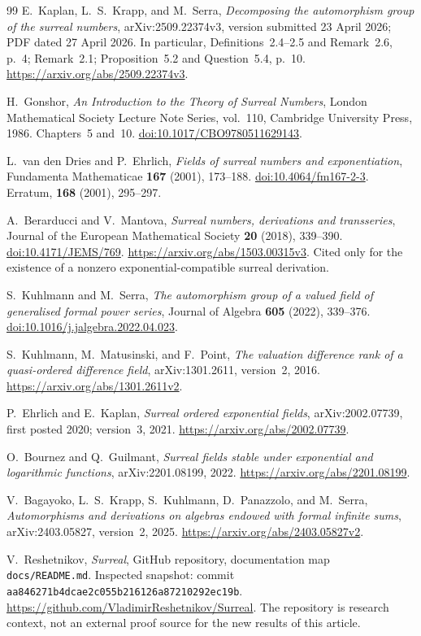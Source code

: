 \documentclass[11pt]{article}
\theoremstyle{definition}
\theoremstyle{remark}
\numberwithin{equation}{section}
\begin{document}
\begin{thebibliography}{99}
E.~Kaplan, L.~S.~Krapp, and M.~Serra,
\emph{Decomposing the automorphism group of the surreal numbers},
arXiv:2509.22374v3, version submitted 23 April 2026; PDF dated 27 April 2026.
In particular, Definitions~2.4--2.5 and Remark~2.6, p.~4; Remark~2.1;
Proposition~5.2 and Question~5.4, p.~10.
\url{https://arxiv.org/abs/2509.22374v3}.

H.~Gonshor,
\emph{An Introduction to the Theory of Surreal Numbers},
London Mathematical Society Lecture Note Series, vol.~110,
Cambridge University Press, 1986. Chapters~5 and~10.
\href{https://doi.org/10.1017/CBO9780511629143}{doi:10.1017/CBO9780511629143}.

L.~van den Dries and P.~Ehrlich,
\emph{Fields of surreal numbers and exponentiation},
Fundamenta Mathematicae \textbf{167} (2001), 173--188.
\href{https://doi.org/10.4064/fm167-2-3}{doi:10.4064/fm167-2-3}.
Erratum, \textbf{168} (2001), 295--297.

A.~Berarducci and V.~Mantova,
\emph{Surreal numbers, derivations and transseries},
Journal of the European Mathematical Society \textbf{20} (2018), 339--390.
\href{https://doi.org/10.4171/JEMS/769}{doi:10.4171/JEMS/769}.
\url{https://arxiv.org/abs/1503.00315v3}.
Cited only for the existence of a nonzero exponential-compatible surreal
derivation.

S.~Kuhlmann and M.~Serra,
\emph{The automorphism group of a valued field of generalised formal power series},
Journal of Algebra \textbf{605} (2022), 339--376.
\href{https://doi.org/10.1016/j.jalgebra.2022.04.023}{doi:10.1016/j.jalgebra.2022.04.023}.

S.~Kuhlmann, M.~Matusinski, and F.~Point,
\emph{The valuation difference rank of a quasi-ordered difference field},
arXiv:1301.2611, version~2, 2016.
\url{https://arxiv.org/abs/1301.2611v2}.

P.~Ehrlich and E.~Kaplan,
\emph{Surreal ordered exponential fields},
arXiv:2002.07739, first posted 2020; version~3, 2021.
\url{https://arxiv.org/abs/2002.07739}.

O.~Bournez and Q.~Guilmant,
\emph{Surreal fields stable under exponential and logarithmic functions},
arXiv:2201.08199, 2022.
\url{https://arxiv.org/abs/2201.08199}.

V.~Bagayoko, L.~S.~Krapp, S.~Kuhlmann, D.~Panazzolo, and M.~Serra,
\emph{Automorphisms and derivations on algebras endowed with formal infinite sums},
arXiv:2403.05827, version~2, 2025.
\url{https://arxiv.org/abs/2403.05827v2}.

\begingroup\raggedright
V.~Reshetnikov,
\emph{Surreal}, GitHub repository, documentation map \texttt{docs/README.md}.
Inspected snapshot: commit\\
\texttt{aa846271b4dcae2c055b216126a87210292ec19b}.
\url{https://github.com/VladimirReshetnikov/Surreal}.
The repository is research context, not an external proof source for the
new results of this article.
\par\endgroup
\end{thebibliography}
\end{document}
